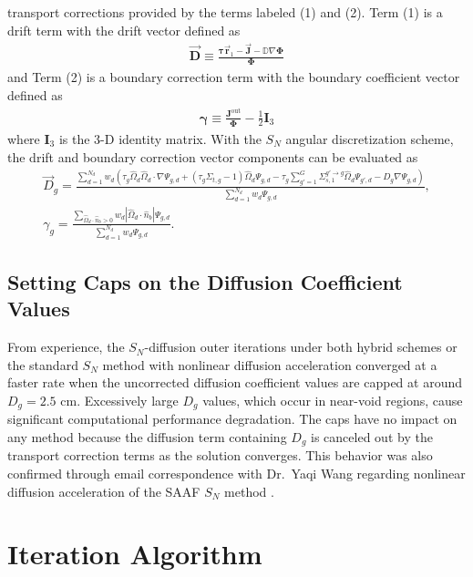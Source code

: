 transport corrections provided by the terms labeled (1) and (2). Term (1) is a drift term with
the drift vector defined as
%
\begin{gather}
  \vec{\bm{D}} \equiv \frac{\bm{\tau}\vec{\bm{r}}_1-\vec{\bm{J}}-\mathbb{D}\nabla\bm{\Phi}}{\bm{\Phi}}
\end{gather}
%
and Term (2) is a boundary correction term with the boundary coefficient vector defined as
%
\begin{gather}
  \bm{\gamma} \equiv \frac{\bm{J}^\text{out}}{\bm{\Phi}}-\frac{1}{2}\bm{I}_3
\end{gather}
where $\bm{I}_3$ is the 3-D identity matrix.
With the $S_N$ angular discretization scheme, the drift and boundary correction vector components
can be evaluated as
%
\begin{gather}
  \vec{D}_g = \frac{\sum^{N_d}_{d=1}w_d\left(\tau_g\hat{\Omega}_d\hat{\Omega}_d\cdot\nabla\Psi_{g,d}
  + \left(\tau_g\Sigma_{t,g}-1\right)\hat{\Omega}_d\Psi_{g,d}
  - \tau_g\sum^G_{g'=1}\Sigma^{g'\rightarrow g}_{s,1}\hat{\Omega}_d\Psi_{g',d}
  - D_g\nabla\Psi_{g,d}\right)}{\sum^{N_d}_{d=1}w_d\Psi_{g,d}}, \label{eq:drift} \\
  \gamma_g =
  \frac{\sum_{\hat{\Omega}_d\cdot\hat{n}_b > 0}w_d |\hat{\Omega}_d\cdot\hat{n}_b |
  \Psi_{g,d}}{\sum^{N_d}_{d=1}w_d\Psi_{g,d}}. \label{eq:bound-coef}
\end{gather}

\subsection{Setting Caps on the Diffusion Coefficient Values} \label{sec:diffcoef-cap}

From experience, the $S_N$-diffusion outer iterations under both hybrid schemes or the standard
$S_N$ method with nonlinear diffusion acceleration converged at a faster rate when the uncorrected
diffusion coefficient values are capped at around $D_g=2.5$ cm. Excessively large $D_g$ values,
which occur in near-void regions, cause significant computational performance degradation. The caps
have no impact on any method because the diffusion term containing $D_g$ is canceled out by the
transport correction terms as the solution converges. This behavior was also confirmed through
email correspondence with Dr.\ Yaqi Wang regarding nonlinear diffusion acceleration of the
\gls{SAAF} $S_N$ method \cite{wang_diffusion_2014}.

\section{Iteration Algorithm} \label{sec:hybrid-algorithm}

